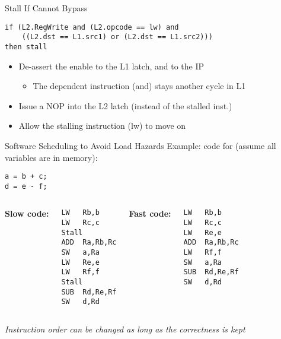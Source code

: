 \documentclass[aspectratio=169,12pt]{beamer}
\begin{document}
\begin{frame}[fragile]{Stall If Cannot Bypass}
    \begin{verbatim}
if (L2.RegWrite and (L2.opcode == lw) and 
    ((L2.dst == L1.src1) or (L2.dst == L1.src2))) 
then stall
    \end{verbatim}
    
    \vspace{0.5cm}
    \begin{itemize}
        \item De-assert the enable to the L1 latch, and to the IP
        \begin{itemize}
            \item The dependent instruction (and) stays another cycle in L1
        \end{itemize}
        \item Issue a NOP into the L2 latch (instead of the stalled inst.)
        \item Allow the stalling instruction (lw) to move on
    \end{itemize}
    
    \centering
\end{frame}

\begin{frame}[fragile]{Software Scheduling to Avoid Load Hazards}
    Example: code for (assume all variables are in memory):
    \begin{center}
        \texttt{a = b + c;}\\
        \texttt{d = e - f;}
    \end{center}
    
    \begin{columns}
        \textbf{Slow code:}
        \begin{verbatim}
LW   Rb,b
LW   Rc,c
Stall
ADD  Ra,Rb,Rc
SW   a,Ra
LW   Re,e
LW   Rf,f
Stall
SUB  Rd,Re,Rf
SW   d,Rd
        \end{verbatim}
        
        \textbf{Fast code:}
        \begin{verbatim}
LW   Rb,b
LW   Rc,c
LW   Re,e
ADD  Ra,Rb,Rc
LW   Rf,f
SW   a,Ra
SUB  Rd,Re,Rf
SW   d,Rd
        \end{verbatim}
    \end{columns}
    
    \vspace{0.5cm}
    \centering
    \textit{Instruction order can be changed as long as the correctness is kept}
\end{frame}
\end{document}

